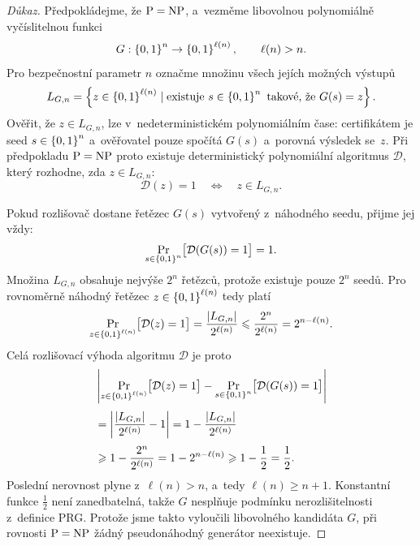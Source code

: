 \begin{proof}[Důkaz]
    Předpokládejme, že $\operatorname{P}=\operatorname{NP}$, a~vezměme libovolnou polynomiálně vyčíslitelnou funkci
    \[
        G:\left\{0,1\right\}^{n} \rightarrow \left\{0,1\right\}^{\ell(n)},
        \qquad
        \ell(n)>n.
    \]
    Pro bezpečnostní parametr $n$ označme množinu všech jejích možných výstupů
    \[
        L_{G,n}
        =
        \left\{
            z\in\left\{0,1\right\}^{\ell(n)}
            \mid
            \text{existuje }s\in\left\{0,1\right\}^{n}\text{ takové, že }G(s)=z
        \right\}.
    \]
    Ověřit, že $z\in L_{G,n}$, lze v~nedeterministickém polynomiálním čase: certifikátem je seed
    $s\in\left\{0,1\right\}^{n}$ a~ověřovatel pouze spočítá $G(s)$ a~porovná výsledek se~$z$. Při předpokladu
    $\operatorname{P}=\operatorname{NP}$ proto existuje deterministický polynomiální algoritmus $\mathcal D$, který
    rozhodne, zda $z\in L_{G,n}$:
    \[
        \mathcal D(z)=1
        \quad\Longleftrightarrow\quad
        z\in L_{G,n}.
    \]

    Pokud rozlišovač dostane řetězec $G(s)$ vytvořený z~náhodného seedu, přijme jej vždy:
    \[
        \Pr_{s\in\left\{0,1\right\}^{n}}
        \bigl[\mathcal D(G(s))=1\bigr]
        =
        1.
    \]
    Množina $L_{G,n}$ obsahuje nejvýše $2^n$ řetězců, protože existuje pouze $2^n$ seedů. Pro
    rovnoměrně náhodný řetězec $z\in\left\{0,1\right\}^{\ell(n)}$ tedy platí
    \[
        \Pr_{z\in\left\{0,1\right\}^{\ell(n)}}
        \bigl[\mathcal D(z)=1\bigr]
        =
        \frac{\left| L_{G,n} \right|}{2^{\ell(n)}}
        \leqslant
        \frac{2^n}{2^{\ell(n)}}
        =
        2^{n-\ell(n)}.
    \]
    Celá rozlišovací výhoda algoritmu $\mathcal D$ je proto
    \begin{align*}
        &
        \left|
        \Pr_{z\in\left\{0,1\right\}^{\ell(n)}}
        \bigl[\mathcal D(z)=1\bigr]
        -
        \Pr_{s\in\left\{0,1\right\}^{n}}
        \bigl[\mathcal D(G(s))=1\bigr]
        \right|
        \\[1mm]
        &=
        \left|
        \frac{\left| L_{G,n} \right|}{2^{\ell(n)}}-1
        \right|
        =
        1-\frac{\left| L_{G,n} \right|}{2^{\ell(n)}}
        \\[1mm]
        &\geqslant
        1-\frac{2^n}{2^{\ell(n)}}
        =
        1-2^{n-\ell(n)}
        \geqslant
        1-\frac{1}{2}
        =
        \frac{1}{2}.
    \end{align*}
    Poslední nerovnost plyne z~$\ell(n)>n$, a~tedy $\ell(n)\geqslant n+1$. Konstantní funkce
    $\frac{1}{2}$ není zanedbatelná, takže $G$ nesplňuje podmínku nerozlišitelnosti z~definice PRG.
    Protože jsme takto vyloučili libovolného kandidáta $G$, při rovnosti $\operatorname{P}=\operatorname{NP}$ žádný
    pseudonáhodný generátor neexistuje.
\end{proof}


